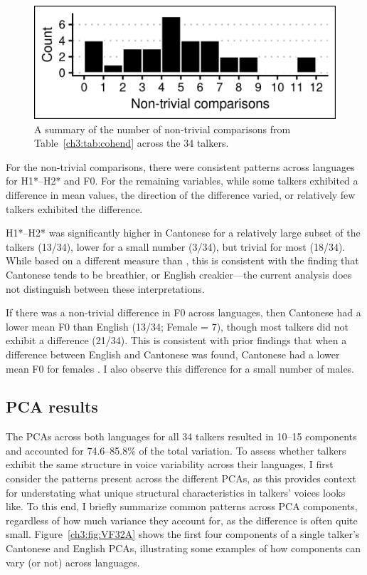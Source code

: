 \begin{figure}[htbp]
\begin{center}
\includegraphics[width=0.875\linewidth]{figures/3-non-trivial_counts_by_talker.png} 
\caption{A summary of the number of non-trivial comparisons from Table~\ref{ch3:tab:cohend} across the 34 talkers.}
\label{ch3:fig:ntcounts}
\end{center}
\end{figure}

For the non-trivial comparisons, there were consistent patterns across languages for H1*--H2* and F0. For the remaining variables, while some talkers exhibited a difference in mean values, the direction of the difference varied, or relatively few talkers exhibited the difference. 

H1*--H2* was significantly higher in Cantonese for a relatively large subset of the talkers (13/34), lower for a small number (3/34), but trivial for most (18/34). While based on a different measure than \citep{ng_2012_ltas}, this is consistent with the finding that Cantonese tends to be breathier, or English creakier---the current analysis does not distinguish between these interpretations.

If there was a non-trivial difference in F0 across languages, then Cantonese had a lower mean F0 than English (13/34; Female = 7), though most talkers did not exhibit a difference (21/34). This is consistent with prior findings that when a difference between English and Cantonese was found, Cantonese had a lower mean F0 for females \citep{ng_2012_ltas,altenberg_2006_f0}. I also observe this difference for a small number of males. 

\subsection{PCA results}\label{ch3:sec:pca_results} 
The PCAs across both languages for all 34 talkers resulted in 10--15 components and accounted for 74.6--85.8\% of the total variation. To assess whether talkers exhibit the same structure in voice variability across their languages, I first consider the patterns present across the different PCAs, as this provides context for understating what unique structural characteristics in talkers' voices looks like. To this end, I briefly summarize common patterns across PCA components, regardless of how much variance they account for, as the difference is often quite small. Figure~\ref{ch3:fig:VF32A} shows the first four components of a single talker's Cantonese and English PCAs, illustrating some examples of how components can vary (or not) across languages. 


